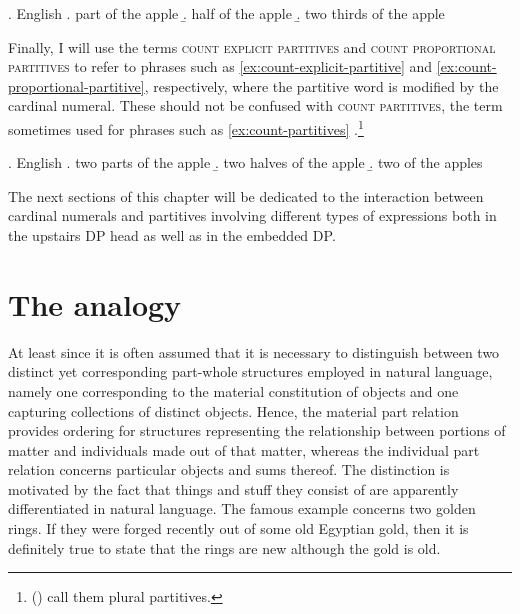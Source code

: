 \ex. English
\a. part of the apple\label{ex:explicit-partitive}
\b. half of the apple\label{ex:proportional-partitive}
\b. two thirds of the apple\label{ex:fraction-partitive}

Finally, I will use the terms \textsc{count explicit partitives} and \textsc{count proportional partitives} to refer to phrases such as \ref{ex:count-explicit-partitive} and \ref{ex:count-proportional-partitive}, respectively, where the partitive word is modified by the cardinal numeral. These should not be confused with \textsc{count partitives}, the term sometimes used for phrases such as \ref{ex:count-partitives} \citep[e.g.,][]{ionin_matushansky_ruys2006parts}.\footnote{\citeauthor{quirk_greenbaum_leech_svartvik1985comprehensive} (\citeyear[p. 249]{quirk_greenbaum_leech_svartvik1985comprehensive}) call them plural partitives.}

\ex. English
\a. two parts of the apple\label{ex:count-explicit-partitive}
\b. two halves of the apple\label{ex:count-proportional-partitive}
\b. two of the apples\label{ex:count-partitives}

The next sections of this chapter will be dedicated to the interaction between cardinal numerals and partitives involving different types of expressions both in the upstairs DP head as well as in the embedded DP.

\section{The analogy}\label{sec:the-analogy}

At least since \citet{link1983logical} it is often assumed that it is necessary to distinguish between two distinct yet corresponding part-whole structures employed in natural language, namely one corresponding to the material constitution of objects and one capturing collections of distinct objects. Hence, the material part relation provides ordering for structures representing the relationship between portions of matter and individuals made out of that matter, whereas the individual part relation concerns particular objects and sums thereof. The distinction is motivated by the fact that things and stuff they consist of are apparently differentiated in natural language. The famous example concerns two golden rings. If they were forged recently out of some old Egyptian gold, then it is definitely true to state that the rings are new although the gold is old. 

